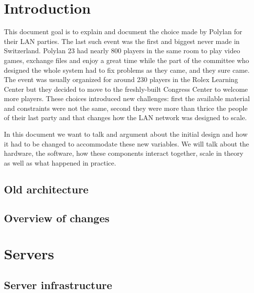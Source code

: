 \documentclass[a4paper,12pt]{article}
\begin{document}
\section{Introduction}
This document goal is to explain and document the choice made by Polylan for their LAN parties.
The last such event was the first and biggest never made in Switzerland.
Polylan 23 had nearly 800 players in the same room to play video games, exchange files and enjoy a great time while the part of the committee who designed the whole system had to fix problems as they came, and they sure came.
The event was usually organized for around 230 players in the Rolex Learning Center but they decided to move to the freshly-built Congress Center to welcome more players.
These choices introduced new challenges: first the available material and constraints were not the same, second they were more than thrice the people of their last party and that changes how the LAN network was designed to scale.

In this document we want to talk and argument about the initial design and how it had to be changed to accommodate these new variables.
We will talk about the hardware, the software, how these components interact together, scale in theory as well as what happened in practice.


\subsection{Old architecture}

\subsection{Overview of changes}


\section{Servers}

\subsection{Server infrastructure}
\end{document}

